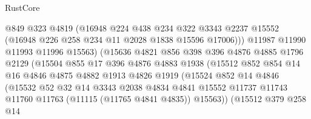 \begin{lexlean}{RustCore}
\begin{coremodule}
                              @849
                              @323
                              @4819
                              (@16948
                                @224
                                @438
                                @234
                                @322
                                @3343
                                @2237
                                @15552
                                (@16948 @226 @258 @234 @11 @2028 @1838 @15596 @17006)))
                            @11987
                            @11990
                            @11993
                            @11996
                            @15563)
                          (@15636
                            @4821
                            @856
                            @398
                            @396
                            @4876
                            @4885
                            @1796
                            @2129
                            (@15504
                              @855
                              @17
                              @396
                              @4876
                              @4883
                              @1938
                              (@15512
                                @852
                                @854
                                @14
                                @16
                                @4846
                                @4875
                                @4882
                                @1913
                                @4826
                                @1919
                                (@15524
                                  @852
                                  @14
                                  @4846
                                  (@15532
                                    @52
                                    @32
                                    @14
                                    @3343
                                    @2038
                                    @4834
                                    @4841
                                    @15552
                                    @11737
                                    @11743
                                    @11760
                                    @11763
                                    (@11115 (@11765 @4841 @4835))
                                    @15563))
                                (@15512
                                  @379
                                  @258
                                  @14

\end{coremodule}
\end{lexlean}
